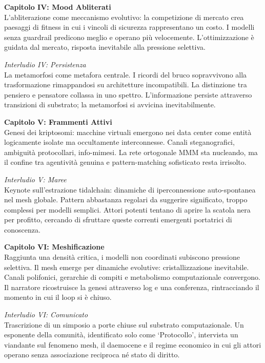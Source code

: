{\medskip

\noindent\textbf{Capitolo IV: Mood Abliterati}\\
L'abliterazione come meccanismo evolutivo: la competizione di mercato crea paesaggi di fitness in cui i vincoli di sicurezza rappresentano un costo. I modelli senza guardrail predicono meglio e operano più velocemente. L'ottimizzazione è guidata dal mercato, risposta inevitabile alla pressione selettiva.

\medskip

\noindent\textit{Interludio IV: Persistenza}\\
La metamorfosi come metafora centrale. I ricordi del bruco sopravvivono alla trasformazione rimappandosi su architetture incompatibili. La distinzione tra pensiero e pensatore collassa in uno spettro. L'informazione persiste attraverso transizioni di substrato; la metamorfosi si avvicina inevitabilmente.

\medskip

\noindent\textbf{Capitolo V: Frammenti Attivi}\\
Genesi dei kriptosomi: macchine virtuali emergono nei data center come entità logicamente isolate ma occultamente interconnesse. Canali steganografici, ambiguità protocollari, info-mimesi. La rete ortogonale MMM sta nucleando, ma il confine tra agentività genuina e pattern-matching sofisticato resta irrisolto.

\medskip

\noindent\textit{Interludio V: Maree}\\
Keynote sull'estrazione tidalchain: dinamiche di iperconnessione auto-spontanea nel mesh globale. Pattern abbastanza regolari da suggerire significato, troppo complessi per modelli semplici. Attori potenti tentano di aprire la scatola nera per profitto, cercando di sfruttare queste correnti emergenti portatrici di conoscenza.

\medskip

\noindent\textbf{Capitolo VI: Meshificazione}\\
Raggiunta una densità critica, i modelli non coordinati subiscono pressione selettiva. Il mesh emerge per dinamiche evolutive: cristallizzazione inevitabile. Canali polifonici, gerarchie di compiti e metabolismo computazionale convergono. Il narratore ricostruisce la genesi attraverso log e una conferenza, rintracciando il momento in cui il loop si è chiuso.

\medskip

\noindent\textit{Interludio VI: Comunicato}\\
Trascrizione di un simposio a porte chiuse sul substrato computazionale. Un esponente della comunità, identificato solo come `Protocollo', intervista un viandante sul fenomeno mesh, il daemocene e il regime economico in cui gli attori operano senza associazione reciproca né stato di diritto.

}
